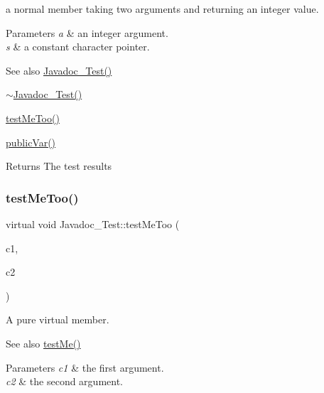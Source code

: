 a normal member taking two arguments and returning an integer value. 
\begin{DoxyParams}{Parameters}
{\em a} & an integer argument. \\
\hline
{\em s} & a constant character pointer. \\
\hline
\end{DoxyParams}
\begin{DoxySeeAlso}{See also}
\mbox{\hyperlink{class_javadoc___test_a17313327932ae97596b0a455ba8342cc}{Javadoc\+\_\+\+Test()}} 

\mbox{\hyperlink{class_javadoc___test_a60016cd15a4ed82bbc35be79a0a6a6b5}{$\sim$\+Javadoc\+\_\+\+Test()}} 

\mbox{\hyperlink{class_javadoc___test_ac2b39cabbe80957ae3e8bc2bd4e887f6}{test\+Me\+Too()}} 

\mbox{\hyperlink{class_javadoc___test_a44a516fbc3a4865e2dcae34649c9df6a}{public\+Var()}} 
\end{DoxySeeAlso}
\begin{DoxyReturn}{Returns}
The test results 
\end{DoxyReturn}
\mbox{\label{class_javadoc___test_ac2b39cabbe80957ae3e8bc2bd4e887f6}} 
\subsubsection{\texorpdfstring{test\+Me\+Too()}{testMeToo()}}
{\footnotesize\ttfamily virtual void Javadoc\+\_\+\+Test\+::test\+Me\+Too (\begin{DoxyParamCaption}\item[{char}]{c1,  }\item[{char}]{c2 }\end{DoxyParamCaption})\hspace{0.3cm}{\ttfamily [pure virtual]}}

A pure virtual member. \begin{DoxySeeAlso}{See also}
\mbox{\hyperlink{class_javadoc___test_a0c472683ed25ff096e8a9edfb18d550c}{test\+Me()}} 
\end{DoxySeeAlso}

\begin{DoxyParams}{Parameters}
{\em c1} & the first argument. \\
\hline
{\em c2} & the second argument. \\
\hline
\end{DoxyParams}


